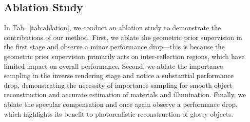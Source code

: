 \subsection{Ablation Study}
In Tab.~\ref{tab:ablation}, we conduct an ablation study to demonstrate the contributions of our method. First, we ablate the geometric prior supervision in the first stage and observe a minor performance drop—this is because the geometric prior supervision primarily acts on inter-reflection regions, which have limited impact on overall performance. Second, we ablate the importance sampling in the inverse rendering stage and notice a substantial performance drop, demonstrating the necessity of importance sampling for smooth object reconstruction and accurate estimation of materials and illumination. Finally, we ablate the specular compensation and once again observe a performance drop, which highlights its benefit to photorealistic reconstruction of glossy objects.


\begin{table}[]
\centering
\captionsetup{width=0.9\linewidth}
\caption{Ablation study on the Glossy Synthetic dataset~\cite{liu2023nero}.}
\label{tab:ablation}
\vspace{-1em}
\end{table}